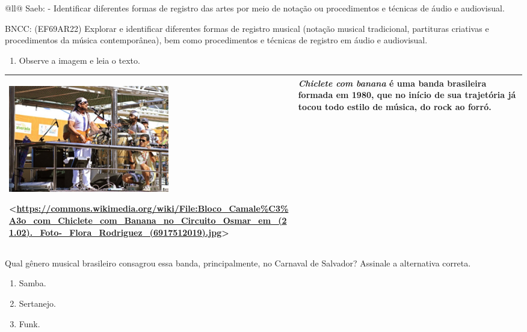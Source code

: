 \begin{itemize}
\begin{itemize}
\begin{escolha}[]{@{}ll@{}}
Saeb: - Identificar diferentes formas de registro das artes por meio de
notação ou procedimentos e técnicas de áudio e audiovisual.

BNCC: (EF69AR22) Explorar e identificar diferentes formas de registro
musical (notação musical tradicional, partituras criativas e
procedimentos da música contemporânea), bem como procedimentos e
técnicas de registro em áudio e audiovisual.

\begin{enumerate}
\def\labelenumi{\arabic{enumi}.}
\item
  Observe a imagem e leia o texto.
\end{enumerate}

\begin{longtable}[]{@{}ll@{}}
\toprule
\begin{minipage}[t]{0.48\columnwidth}\raggedright\strut
\includegraphics[width=2.76042in,height=1.83333in]{media/image35.jpeg}

\textless{}\url{https://commons.wikimedia.org/wiki/File:Bloco_Camale\%C3\%A3o_com_Chiclete_com_Banana_no_Circuito_Osmar_em_(21.02)._Foto-_Flora_Rodriguez_(6917512019).jpg}\textgreater{}\strut
\end{minipage} & \begin{minipage}[t]{0.48\columnwidth}\raggedright\strut
\emph{Chiclete com banana} é uma banda brasileira formada em 1980, que
no início de sua trajetória já tocou todo estilo de música, do rock ao
forró.\strut
\end{minipage}\tabularnewline
\bottomrule
\end{longtable}

Qual gênero musical brasileiro consagrou essa banda, principalmente, no
Carnaval de Salvador? Assinale a alternativa correta.

\begin{enumerate}
\def\labelenumi{\alph{enumi})}
\item
  Samba.
\item
  Sertanejo.
\item
  Funk.
\end{enumerate}


\end{escolha}
\end{itemize}
\end{itemize}
